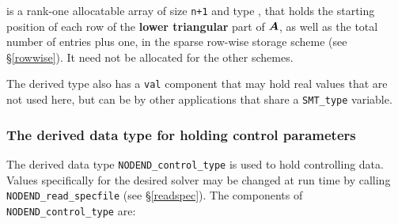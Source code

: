 \documentclass{galahad}
\newcommand{\packagename}{NODEND}
\begin{document}
\begin{description}
 is a rank-one allocatable array of size {\tt n+1} and type
\integer, that holds the starting position of
each row of the {\bf lower triangular} part of ${\bm{A}}$, as well
as the total number of entries plus one, in the sparse row-wise storage
scheme (see \S\ref{rowwise}). It need not be allocated for the
other schemes.

\end{description}
The derived type also has a {\tt val} component that may hold real values
that are not used here, but can be by other applications that share
a {\tt SMT\_type} variable.


\subsubsection{The derived data type for holding control
 parameters}\label{typecontrol}
The derived data type
{\tt \packagename\_control\_type}
is used to hold controlling data. Values specifically for the desired solver
may be changed at run time by calling
{\tt \packagename\_read\-\_specfile}
(see \S\ref{readspec}).
The components of
{\tt \packagename\_control\_type}
are:
\end{document}
